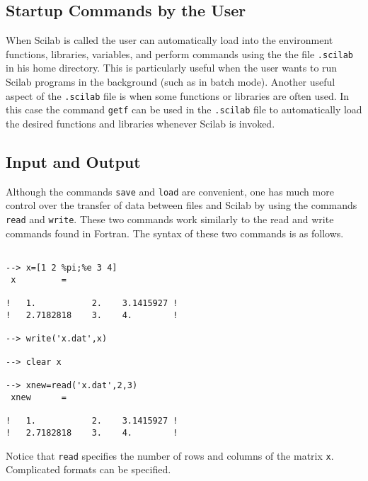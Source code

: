 \subsection{Startup Commands by the User}
\label{s5.2}

	When Scilab is called the user can automatically load
into the environment functions, libraries, variables, and perform
commands using the the file {\tt .scilab} in his home directory.  
This is particularly useful when the user wants to run Scilab programs
in the background (such as in batch mode).  Another useful aspect
of the {\tt .scilab} file is when some functions or libraries
are often used.  In this case the command {\tt getf} can be used
in the {\tt .scilab} file to automatically load the desired 
functions and libraries whenever Scilab is invoked.

\subsection{Input and Output}
\label{s5.3}

	Although the commands {\tt save} and {\tt load} are
convenient, one has much more control over the transfer of
data between files and Scilab by using the commands 
{\tt read}
and {\tt write}.  
These two commands work similarly to the
read and write commands found in Fortran.  The syntax of these
two commands is as follows.  
\begin{verbatim}
 
--> x=[1 2 %pi;%e 3 4]
 x         =
 
!   1.           2.    3.1415927 !
!   2.7182818    3.    4.        !
 
--> write('x.dat',x)
 
--> clear x
 
--> xnew=read('x.dat',2,3)
 xnew      =
 
!   1.           2.    3.1415927 !
!   2.7182818    3.    4.        !
\end{verbatim}
Notice that {\tt read} specifies the number of rows and columns
of the matrix {\tt x}.
Complicated formats can be specified. 


